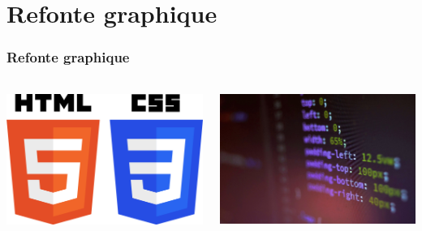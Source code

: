 \documentclass[aspectratio=169]{beamer}
\begin{document}
\section{Refonte graphique}
\begin{frame}
    \frametitle{Refonte graphique}
    \framesubtitle{}
    \begin{columns}
        \hfill
        \begin{column}{0.45\textwidth}
            \begin{center}
                \includegraphics[width=1.0\textwidth]{CSS_HTML.png}
            \end{center}
        \end{column}
        \begin{column}{0.5\textwidth}
            \begin{center}
                \includegraphics[width=1.0\textwidth]{code.jpg}
            \end{center}
        \end{column}
    \end{columns}
\end{frame}
\end{document}
